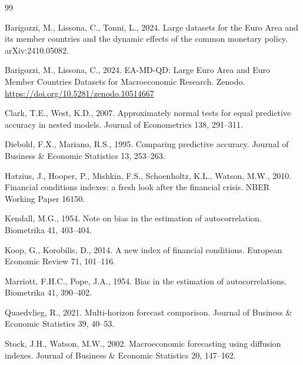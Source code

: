 \documentclass[12pt]{article}
\begin{document}
\begin{thebibliography}{99}

Barigozzi, M., Lissona, C., Tonni, L., 2024. Large datasets for the Euro Area
and its member countries and the dynamic effects of the common monetary policy.
arXiv:2410.05082.

Barigozzi, M., Lissona, C., 2024. EA-MD-QD: Large Euro Area and Euro Member
Countries Datasets for Macroeconomic Research. Zenodo.
\url{https://doi.org/10.5281/zenodo.10514667}

Clark, T.E., West, K.D., 2007. Approximately normal tests for equal predictive
accuracy in nested models. Journal of Econometrics 138, 291--311.

Diebold, F.X., Mariano, R.S., 1995. Comparing predictive accuracy. Journal of
Business \& Economic Statistics 13, 253--263.

Hatzius, J., Hooper, P., Mishkin, F.S., Schoenholtz, K.L., Watson, M.W., 2010.
Financial conditions indexes: a fresh look after the financial crisis. NBER
Working Paper 16150.

Kendall, M.G., 1954. Note on bias in the estimation of autocorrelation.
Biometrika 41, 403--404.

Koop, G., Korobilis, D., 2014. A new index of financial conditions. European
Economic Review 71, 101--116.

Marriott, F.H.C., Pope, J.A., 1954. Bias in the estimation of autocorrelations.
Biometrika 41, 390--402.

Quaedvlieg, R., 2021. Multi-horizon forecast comparison. Journal of Business \&
Economic Statistics 39, 40--53.

Stock, J.H., Watson, M.W., 2002. Macroeconomic forecasting using diffusion
indexes. Journal of Business \& Economic Statistics 20, 147--162.

\end{thebibliography}
\end{document}
